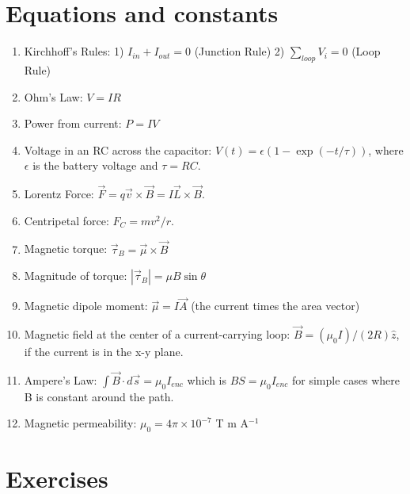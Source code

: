 \documentclass[10pt]{article}
\begin{document}
\maketitle

\section{Equations and constants}

\begin{enumerate}
\item Kirchhoff's Rules: 1) $I_{in} + I_{out} = 0$ (Junction Rule) 2) $\sum_{loop} V_i = 0$ (Loop Rule)
\item Ohm's Law: $V = IR$
\item Power from current: $P=IV$
\item Voltage in an RC across the capacitor: $V(t) = \epsilon\left(1 - \exp\left(-t/\tau\right)\right)$, where $\epsilon$ is the battery voltage and $\tau = RC$.
\item Lorentz Force: $\vec{F} = q \vec{v} \times \vec{B} = I \vec{L} \times \vec{B}$.
\item Centripetal force: $F_C = mv^2/r$.
\item Magnetic torque: $\vec{\tau}_B = \vec{\mu} \times \vec{B}$
\item Magnitude of torque: $|\vec{\tau}_B| = \mu B \sin\theta$
\item Magnetic dipole moment: $\vec{\mu} = I \vec{A}$ (the current times the area vector)
\item Magnetic field at the center of a current-carrying loop: $\vec{B} = (\mu_0 I)/(2 R)\hat{z}$, if the current is in the x-y plane.
\item Ampere's Law: $\int \vec{B} \cdot d\vec{s} = \mu_0 I_{enc}$ which is $B S = \mu_0 I_{enc}$ for simple cases where B is constant around the path.
\item Magnetic permeability: $\mu_0 = 4\pi \times 10^{-7}$ T m A$^{-1}$
\end{enumerate}

\section{Exercises}
\end{document}
